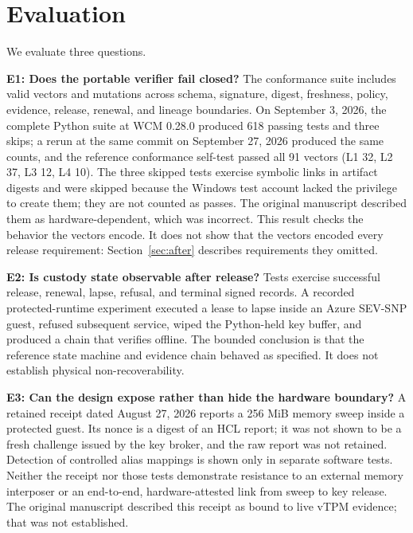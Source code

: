 \documentclass[10pt,letterpaper]{article}
\begin{document}
\section{Evaluation}

We evaluate three questions.

\textbf{E1: Does the portable verifier fail closed?} The conformance suite includes valid vectors and mutations across schema, signature, digest, freshness, policy, evidence, release, renewal, and lineage boundaries. On September 3, 2026, the complete Python suite at WCM 0.28.0 produced 618 passing tests and three skips; a rerun at the same commit on September 27, 2026 produced the same counts, and the reference conformance self-test passed all 91 vectors (L1 32, L2 37, L3 12, L4 10). The three skipped tests exercise symbolic links in artifact digests and were skipped because the Windows test account lacked the privilege to create them; they are not counted as passes. The original manuscript described them as hardware-dependent, which was incorrect. This result checks the behavior the vectors encode. It does not show that the vectors encoded every release requirement: Section~\ref{sec:after} describes requirements they omitted.

\textbf{E2: Is custody state observable after release?} Tests exercise successful release, renewal, lapse, refusal, and terminal signed records. A recorded protected-runtime experiment executed a lease to lapse inside an Azure SEV-SNP guest, refused subsequent service, wiped the Python-held key buffer, and produced a chain that verifies offline. The bounded conclusion is that the reference state machine and evidence chain behaved as specified. It does not establish physical non-recoverability.

\textbf{E3: Can the design expose rather than hide the hardware boundary?} A retained receipt dated August 27, 2026 reports a 256 MiB memory sweep inside a protected guest. Its nonce is a digest of an HCL report; it was not shown to be a fresh challenge issued by the key broker, and the raw report was not retained. Detection of controlled alias mappings is shown only in separate software tests. Neither the receipt nor those tests demonstrate resistance to an external memory interposer or an end-to-end, hardware-attested link from sweep to key release. The original manuscript described this receipt as bound to live vTPM evidence; that was not established.
\end{document}
